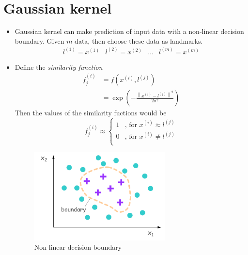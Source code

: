 \section{Gaussian kernel}
\begin{itemize}
\item Gaussian kernel can make prediction of input data with a non-linear decision boundary. Given $m$ data, then choose these data as landmarks.
\begin{equation}
    \begin{array}{cccc}
        l^{(1)} = x^{(1)} & l^{(2)} = x^{(2)} & \dots & l^{(m)} = x^{(m)}
    \end{array}
\end{equation}

\item Define the \emph{similarity function}
\begin{equation}
    \begin{aligned}
        f_{j}^{(i)} &= f(x^{(i)}, l^{(j)}) \\
        &= \exp\left({-\frac{\left\|x^{(i)} - l^{(j)}\right\|^2}{2\sigma^2}}\right)
    \end{aligned}
\end{equation}
Then the values of the similarity fuctions would be
\begin{equation}
    f_{j}^{(i)} \approx
    \left\{\begin{aligned}
        1 &\text{, for } x^{(i)} \approx l^{(j)}\\
        0 &\text{, for } x^{(i)} \neq l^{(j)}\\
    \end{aligned}\right.
\end{equation}
\begin{figure}[!htbp]
    \centering
    \includegraphics[width=2.8in]{./images/nonlinearDecisionBoundary.png}
    \caption{Non-linear decision boundary}
\end{figure}


\end{itemize}
